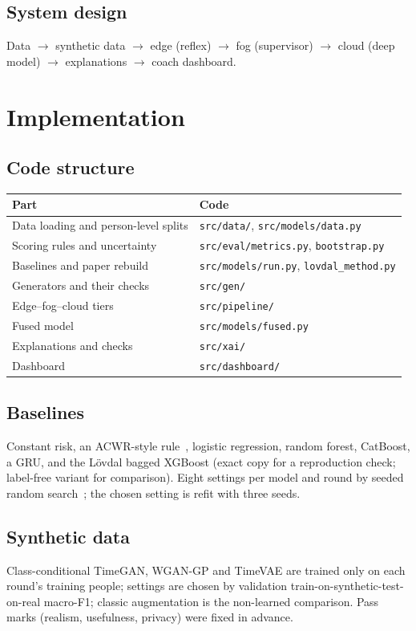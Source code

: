 \documentclass[11pt,a4paper]{report}
\begin{document}
\section{System design}
Data $\rightarrow$ synthetic data $\rightarrow$ edge (reflex) $\rightarrow$ fog (supervisor)
$\rightarrow$ cloud (deep model) $\rightarrow$ explanations $\rightarrow$ coach dashboard.

\chapter{Implementation}
\section{Code structure}
\begin{tabular}{ll}\toprule
Part & Code \\\midrule
Data loading and person-level splits & \texttt{src/data/}, \texttt{src/models/data.py} \\
Scoring rules and uncertainty & \texttt{src/eval/metrics.py}, \texttt{bootstrap.py} \\
Baselines and paper rebuild & \texttt{src/models/run.py}, \texttt{lovdal\_method.py} \\
Generators and their checks & \texttt{src/gen/} \\
Edge--fog--cloud tiers & \texttt{src/pipeline/} \\
Fused model & \texttt{src/models/fused.py} \\
Explanations and checks & \texttt{src/xai/} \\
Dashboard & \texttt{src/dashboard/} \\\bottomrule
\end{tabular}
\section{Baselines}
Constant risk, an ACWR-style rule~\cite{lolli2019}, logistic regression, random forest,
CatBoost, a GRU, and the L\"ovdal bagged XGBoost (exact copy for a reproduction check; label-free
variant for comparison). Eight settings per model and round by seeded random
search~\cite{bergstra2012}; the chosen setting is refit with three seeds.
\section{Synthetic data}
Class-conditional TimeGAN, WGAN-GP and TimeVAE are trained only on each round's training people;
settings are chosen by validation train-on-synthetic-test-on-real macro-F1; classic augmentation
is the non-learned comparison. Pass marks (realism, usefulness, privacy) were fixed in advance.
\end{document}
